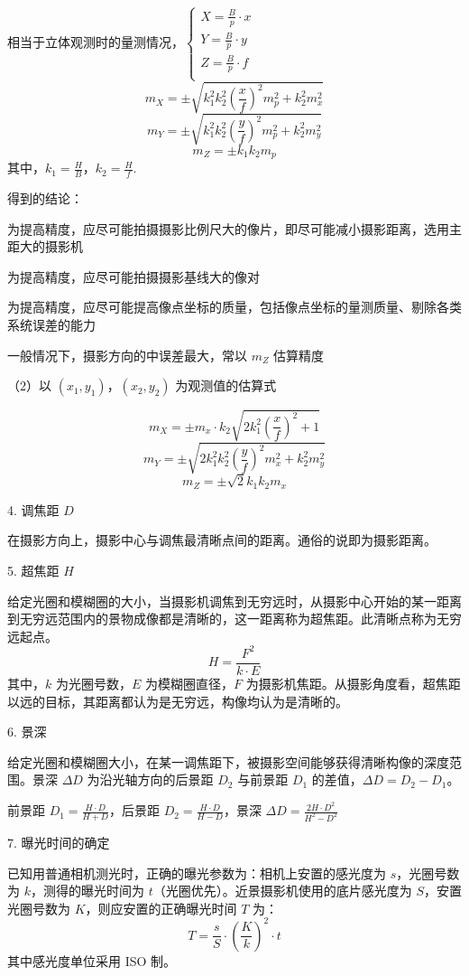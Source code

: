 \documentclass[a4paper]{ctexart}
\begin{document}
相当于立体观测时的量测情况，$\begin{cases}
	X=\frac{B}{p}\cdot x\\
	Y=\frac{B}{p}\cdot y\\
	Z=\frac{B}{p}\cdot f\\
\end{cases}$
$$
m_X=\pm \sqrt{k_{1}^{2}k_{2}^{2}\left( \frac{x}{f} \right) ^2m_{p}^{2}+k_{2}^{2}m_{x}^{2}}
$$
$$
m_Y=\pm \sqrt{k_{1}^{2}k_{2}^{2}\left( \frac{y}{f} \right) ^2m_{p}^{2}+k_{2}^{2}m_{y}^{2}}
$$
$$
m_Z=\pm k_1k_2m_p
$$
其中，$k_1=\frac{H}{B}$，$k_2=\frac{H}{f}$. 

得到的结论：

为提高精度，应尽可能拍摄摄影比例尺大的像片，即尽可能减小摄影距离，选用主距大的摄影机

为提高精度，应尽可能拍摄摄影基线大的像对

为提高精度，应尽可能提高像点坐标的质量，包括像点坐标的量测质量、剔除各类系统误差的能力

一般情况下，摄影方向的中误差最大，常以 $m_Z$ 估算精度

（2）以 $(x_1,y_1)$，$(x_2,y_2)$ 为观测值的估算式

$$
m_X=\pm m_x\cdot k_2\sqrt{2k_{1}^{2}\left( \frac{x}{f} \right) ^2+1}
$$
$$
m_Y=\pm \sqrt{2k_{1}^{2}k_{2}^{2}\left( \frac{y}{f} \right) ^2m_{x}^{2}+k_{2}^{2}m_{y}^{2}}
$$
$$
m_Z=\pm \sqrt{2}k_1k_2m_x
$$

4. 调焦距 $D$

在摄影方向上，摄影中心与调焦最清晰点间的距离。通俗的说即为摄影距离。

5. 超焦距 $H$

给定光圈和模糊圈的大小，当摄影机调焦到无穷远时，从摄影中心开始的某一距离到无穷远范围内的景物成像都是清晰的，这一距离称为超焦距。此清晰点称为无穷远起点。
$$
H=\frac{F^2}{k\cdot E}
$$
其中，$k$ 为光圈号数，$E$ 为模糊圈直径，$F$ 为摄影机焦距。从摄影角度看，超焦距以远的目标，其距离都认为是无穷远，构像均认为是清晰的。

6. 景深

给定光圈和模糊圈大小，在某一调焦距下，被摄影空间能够获得清晰构像的深度范围。景深 $\Delta D$ 为沿光轴方向的后景距 $D_2$ 与前景距 $D_1$ 的差值，$\Delta D=D_2-D_1$。

前景距 $D_1=\frac{H\cdot D}{H+D}$，后景距 $D_2=\frac{H\cdot D}{H-D}$，景深 $\Delta D=\frac{2H\cdot D^2}{H^2-D^2}$

7. 曝光时间的确定

已知用普通相机测光时，正确的曝光参数为：相机上安置的感光度为 $s$，光圈号数为 $k$，测得的曝光时间为 $t$（光圈优先）。近景摄影机使用的底片感光度为 $S$，安置光圈号数为 $K$，则应安置的正确曝光时间 $T$ 为：
$$
T=\frac{s}{S}\cdot \left( \frac{K}{k} \right) ^2\cdot t
$$
其中感光度单位采用 ISO 制。
\end{document}

